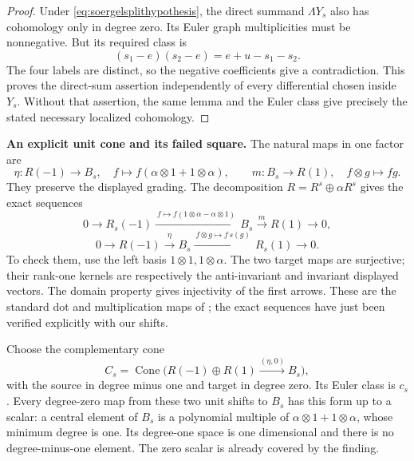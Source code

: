 \begin{proof}
Under \eqref{eq:soergelsplithypothesis}, the direct
summand \(\Lambda Y_s\) also has cohomology only in degree
zero. Its Euler graph multiplicities must be nonnegative.
But its required class is
\[
             (s_1-e)(s_2-e)=e+u-s_1-s_2.
\]
The four labels are distinct, so the negative coefficients
give a contradiction. This proves the direct-sum assertion
independently of every differential chosen inside \(Y_s\).
Without that assertion, the same lemma and the Euler class
give precisely the stated necessary localized cohomology.
\end{proof}

\par\smallskip\noindent\textbf{An explicit unit cone and its failed square.}\quad
The natural maps in one factor are
\[
 \eta:R(-1)\longrightarrow B_s,
 \quad f\longmapsto f(\alpha\otimes1+1\otimes\alpha),
 \qquad
 m:B_s\longrightarrow R(1),\quad f\otimes g\longmapsto fg.
\]
They preserve the displayed grading. The decomposition
\(R=R^s\oplus\alpha R^s\) gives the exact sequences
\begin{equation}\label{eq:soergelcounitexact}
 0\longrightarrow R_s(-1)
 \xrightarrow{\ f\mapsto f(1\otimes\alpha-\alpha\otimes1)\ }
 B_s\xrightarrow{m}R(1)\longrightarrow0,
\end{equation}
\begin{equation}\label{eq:soergelunitexact}
 0\longrightarrow R(-1)\xrightarrow{\eta}B_s
 \xrightarrow{\ f\otimes g\mapsto f\,s(g)\ }R_s(1)
 \longrightarrow0.
\end{equation}
To check them, use the left basis
\(1\otimes1,1\otimes\alpha\). The two target maps are
surjective; their rank-one kernels are respectively the
anti-invariant and invariant displayed vectors. The domain
property gives injectivity of the first arrows. These are
the standard dot and multiplication maps of
\cite[\S3.4, pp.~1106--1107]{EW}; the exact sequences have
just been verified explicitly with our shifts.

Choose the complementary cone
\[
 C_s=\operatorname{Cone}\bigl(
 R(-1)\oplus R(1)\xrightarrow{(\eta,0)}B_s\bigr),
\]
with the source in degree minus one and target in degree
zero. Its Euler class is \(c_s\). Every degree-zero map
from these two unit shifts to \(B_s\) has this form up to
a scalar: a central element of \(B_s\) is a polynomial
multiple of \(\alpha\otimes1+1\otimes\alpha\), whose
minimum degree is one. Its degree-one space is one
dimensional and there is no degree-minus-one element.
The zero scalar is already covered by the finding.

